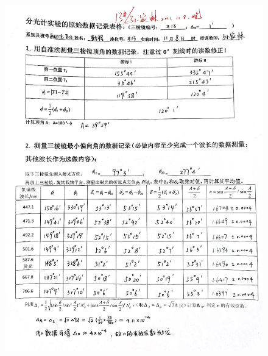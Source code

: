 \documentclass[UTF8]{ctexart}
\begin{document}
\begin{figure}[H]
    \centering
    \includegraphics[scale=0.13]{分光计原始数据.jpg}
    
\end{figure}
\end{document}
